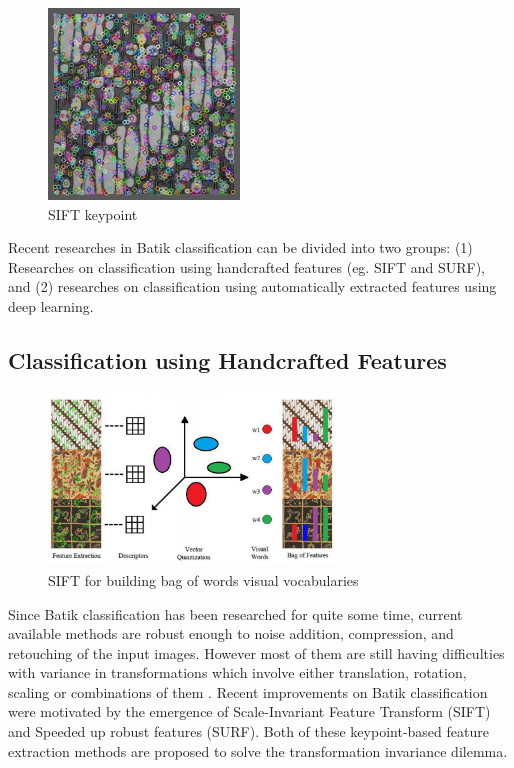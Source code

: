 \documentclass[conference]{IEEEtran}
\begin{document}
\begin{figure}[!b]
\centering
\includegraphics[width=2.0in]{batik-parang-keypoints}
\caption{SIFT keypoint}
\label{fig_batik_parang_keypoints}
\end{figure}


Recent researches in Batik classification can be divided into two groups: (1) Researches on classification using handcrafted features (eg. SIFT and SURF), and (2) researches on classification using automatically extracted features using deep learning.

\subsection{Classification using Handcrafted Features}

\begin{figure}[!t]
\centering
\includegraphics[width=3.0in]{sift-bag-of-words}
\caption{SIFT for building bag of words visual vocabularies}
\label{fig_sift_bag_of_words}
\end{figure}

Since Batik classification has been researched for quite some time, current available methods are robust enough to noise addition, compression, and retouching of the input images. However most of them are still having difficulties with variance in transformations which involve either translation, rotation, scaling or combinations of them \cite{nurhaida2015automatic}. Recent improvements on Batik classification were motivated by the emergence of Scale-Invariant Feature Transform (SIFT)\cite{lowe2004distinctive} and Speeded up robust features (SURF)\cite{bay2006surf}. Both of these keypoint-based feature extraction methods are proposed to solve the transformation invariance dilemma.
\end{document}
